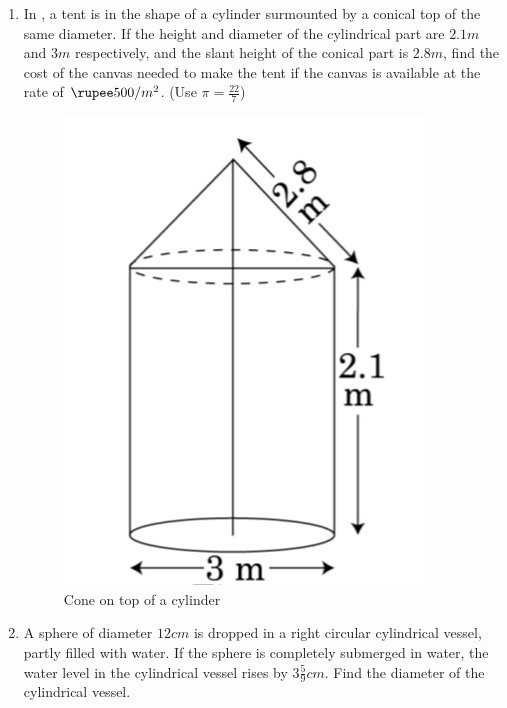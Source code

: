 \documentclass{article}
\begin{document}
\begin{enumerate}
    \item In , a tent is in the shape of a cylinder surmounted by a conical top of the same diameter. If the height and diameter of the cylindrical part are $2.1 m$ and $3 m$ respectively, and the slant height of the conical part is $2.8 m$, find the cost of the canvas needed to make the tent if the canvas is available at the rate of $\rupee 500/ m^2$. (Use $\pi = \frac{22}{7}$)
    \begin{figure}[H]
	\includegraphics[width=\columnwidth]{./coneontopofcylinder.jpg}
        \caption{Cone on top of a cylinder}
        \label{fig:coneontopofcylinder}
    \end{figure}

    \item A sphere of diameter $12 cm$ is dropped in a right circular cylindrical vessel, partly filled with water. If the sphere is completely submerged in water, the water level in the cylindrical vessel rises by $3\frac{5}{9} cm$. Find the diameter of the cylindrical vessel.


\end{enumerate}
\end{document}
